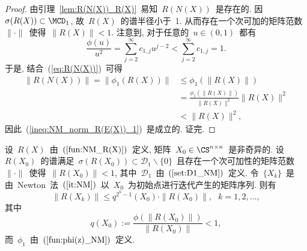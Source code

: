 \begin{proof}
%
由引理~\ref{lem:R(N(X))_R(X)}~易知~$R(N(X))$~是存在的.
因~$\sigma(R(X)) \subset \MCD_1$, 故~$R(X)$~的谱半径小于~1.
从而存在一个次可加的矩阵范数~$\|\cdot\|$~使得~$\|R(X)\| < 1$.
注意到, 对于任意的~$u \in (0,1)$~都有
$$
\frac{\phi(u)}{u^2} = \sum_{j=2}^\infty c_{1,j} u^{j-2} <
\sum_{j=2}^\infty c_{1,j} = 1.
$$
%
于是, 结合~(\ref{eq:R(N(X))})~可得
\begin{align*}
\|R(N(X))\| = \|\phi_1(R(X))\| & \leq \phi_1(\|R(X)\|) \\
& = \frac{\phi_1(\|R(X)\|)}{\|R(X)\|^2}\|R(X)\|^2 \\
& < \|R(X)\|^2,
\end{align*}
%
因此~(\ref{ineq:NM_norm_R(E(X))_1})~是成立的. 证完.
\end{proof}



\begin{lemma}
\label{lem:NM_R(X)_convergence1} %
%
设~$R(X)$~由~$(\ref{fun:NM_R(X)})$~定义, 矩阵~$X_0 \in \CS^{n \times
n}$~是非奇异的. 设~$R(X_0)$~的谱满足~$\sigma(R(X_0)) \subset
\mathcal
{D}_1\backslash\{0\}$~且存在一个次可加性的矩阵范数~$\|\cdot\|$~使得~$\|R(X_0)\|
< 1$, 其中~$\mathcal {D}_1$~由~$(\ref{set:D1_NM})$~定义.
令~$\{X_k\}$~是由~Newton~法~$(\ref{it:NM})$~以~$X_0$~为初始点进行迭代产生的矩阵序列.
则有
\begin{equation}
\label{ineq:NM_norm_R(Xk)_1} \|R(X_k)\| \leq q^{2^k-1}(X_0) \cdot
\|R(X_0)\|, \ \ \ k = 1, 2, \ldots,
\end{equation}
其中
\begin{equation}
\label{cons:NM_q(X0)} q(X_0) := \frac{\phi(\|R(X_0)\|)}{\|R(X_0)\|}
< 1,
\end{equation}
%
而~$\phi_1$~由~$(\ref{fun:phi(z)_NM})$~定义.
\end{lemma}

